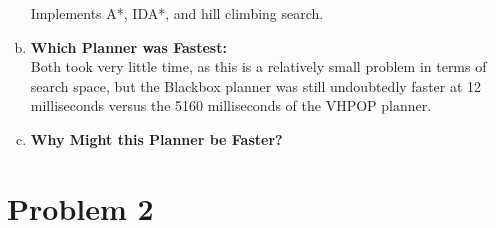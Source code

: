 \documentclass[]{article}
\begin{document}
\begin{enumerate}[(a)]
		 Implements A*, IDA*, and hill climbing search.\\
		
	\item \textbf{Which Planner was Fastest:}\\
	Both took very little time, as this is a relatively small problem in terms of search space, but  the Blackbox planner was still undoubtedly faster at 12 milliseconds versus the 5160 milliseconds of the VHPOP planner. 
	
	\item \textbf{Why Might this Planner be Faster?}\\
	
	\end{enumerate}
\section{Problem 2}
\end{document}
